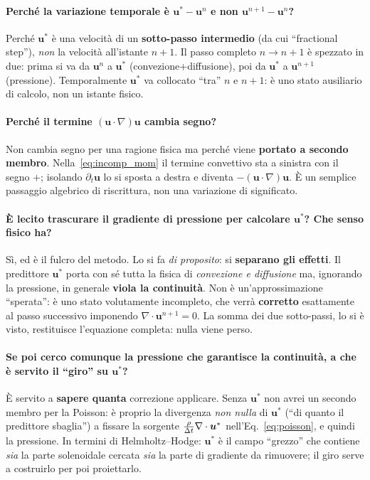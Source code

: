 \paragraph{Perché la variazione temporale è $\bm u^{*}-\bm u^{n}$ e non
$\bm u^{n+1}-\bm u^{n}$?}
Perché $\bm u^{*}$ è una velocità di un \textbf{sotto-passo intermedio} (da cui ``fractional
step''), \emph{non} la velocità all'istante $n+1$. Il passo completo $n\to n+1$ è
spezzato in due: prima si va da $\bm u^{n}$ a $\bm u^{*}$ (convezione+diffusione), poi da
$\bm u^{*}$ a $\bm u^{n+1}$ (pressione). Temporalmente $\bm u^{*}$ va collocato ``tra''
$n$ e $n+1$: è uno stato ausiliario di calcolo, non un istante fisico.

\paragraph{Perché il termine $(\bm u\cdot\nabla)\bm u$ cambia segno?}
Non cambia segno per una ragione fisica ma perché viene \textbf{portato a secondo membro}.
Nella~\eqref{eq:incomp_mom} il termine convettivo sta a sinistra con il segno $+$; isolando
$\partial_t\bm u$ lo si sposta a destra e diventa $-(\bm u\cdot\nabla)\bm u$. È un semplice
passaggio algebrico di riscrittura, non una variazione di significato.

\paragraph{È lecito trascurare il gradiente di pressione per calcolare $\bm u^{*}$?
Che senso fisico ha?}
Sì, ed è il fulcro del metodo. Lo si fa \emph{di proposito}: si \textbf{separano gli
effetti}. Il predittore $\bm u^{*}$ porta con sé tutta la fisica di \emph{convezione e
diffusione} ma, ignorando la pressione, in generale \textbf{viola la continuità}. Non è
un'approssimazione ``sperata'': è uno stato volutamente incompleto, che verrà
\textbf{corretto} esattamente al passo successivo imponendo $\nabla\cdot\bm u^{n+1}=0$. La
somma dei due sotto-passi, lo si è visto, restituisce l'equazione completa: nulla viene
perso.

\paragraph{Se poi cerco comunque la pressione che garantisce la continuità, a che è
servito il ``giro'' su $\bm u^{*}$?}
È servito a \textbf{sapere quanta} correzione applicare. Senza $\bm u^{*}$ non avrei un
secondo membro per la Poisson: è proprio la divergenza \emph{non nulla} di $\bm u^{*}$
(``di quanto il predittore sbaglia'') a fissare la sorgente
$\tfrac{\rho}{\Delta t}\nabla\cdot\bm u^{*}$ nell'Eq.~\eqref{eq:poisson}, e quindi la pressione.
In termini di Helmholtz--Hodge: $\bm u^{*}$ è il campo ``grezzo'' che contiene
\emph{sia} la parte solenoidale cercata \emph{sia} la parte di gradiente da rimuovere; il
giro serve a costruirlo per poi proiettarlo.

